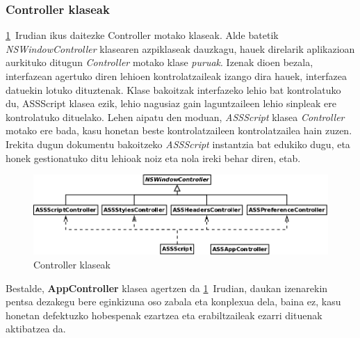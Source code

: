 \subsubsection{Controller klaseak}
\ref{kd-controller}~Irudian ikus daitezke Controller motako klaseak. Alde batetik \textit{NSWindowController} klasearen azpiklaseak dauzkagu, hauek direlarik aplikazioan aurkituko ditugun \textit{Controller} motako klase \textit{puruak}. Izenak dioen bezala, interfazean agertuko diren lehioen kontrolatzaileak izango dira hauek, interfazea datuekin lotuko dituztenak. Klase bakoitzak interfazeko lehio bat kontrolatuko du, ASSScript klasea ezik, lehio nagusiaz gain laguntzaileen lehio sinpleak ere kontrolatuko dituelako. Lehen aipatu den moduan, \textit{ASSScript} klasea \textit{Controller} motako ere bada, kasu honetan beste kontrolatzaileen kontrolatzailea hain zuzen. Irekita dugun dokumentu bakoitzeko \textit{ASSScript} instantzia bat edukiko dugu, eta honek gestionatuko ditu lehioak noiz eta nola ireki behar diren, etab.
\begin{figure}[htp]
\begin{center}
\includegraphics[scale=0.3]{Pictures/Chapter4/Diseinua/KD-Controller.png}
\caption{Controller klaseak}
\label{kd-controller}
\end{center}
\end{figure}
Bestalde, \textbf{AppController} klasea agertzen da \ref{kd-controller}~Irudian, daukan izenarekin pentsa dezakegu bere eginkizuna oso zabala eta konplexua dela, baina ez, kasu honetan defektuzko hobespenak ezartzea eta erabiltzaileak ezarri dituenak aktibatzea da.


